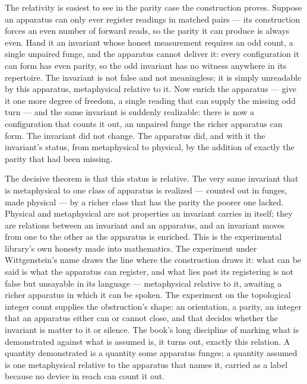 The relativity is easiest to see in the parity case the construction proves. Suppose an apparatus can
only ever register readings in matched pairs --- its construction forces an even number of forward
reads, so the parity it can produce is always even. Hand it an invariant whose honest measurement
requires an odd count, a single unpaired funge, and the apparatus cannot deliver it: every configuration
it can form has even parity, so the odd invariant has no witness anywhere in its repertoire. The
invariant is not false and not meaningless; it is simply unreadable by this apparatus, metaphysical
relative to it. Now enrich the apparatus --- give it one more degree of freedom, a single reading that
can supply the missing odd turn --- and the same invariant is suddenly realizable: there is now a
configuration that counts it out, an unpaired funge the richer apparatus can form. The invariant did not
change. The apparatus did, and with it the invariant's status, from metaphysical to physical, by the
addition of exactly the parity that had been missing.

The decisive theorem is that this status is relative. The very same invariant that is metaphysical to
one class of apparatus is realized --- counted out in funges, made physical --- by a richer class that
has the parity the poorer one lacked. Physical and metaphysical are not properties an invariant carries
in itself; they are relations between an invariant and an apparatus, and an invariant moves from one to
the other as the apparatus is enriched. This is the experimental library's own honesty made into
mathematics. The experiment under Wittgenstein's name draws the line where the construction draws it:
what can be said is what the apparatus can register, and what lies past its registering is not false but
unsayable in its language --- metaphysical relative to it, awaiting a richer apparatus in which it can
be spoken. The experiment on the topological integer count supplies the obstruction's shape: an
orientation, a parity, an integer that an apparatus either can or cannot close, and that decides whether
the invariant is matter to it or silence. The book's long discipline of marking what is demonstrated
against what is assumed is, it turns out, exactly this relation. A quantity demonstrated is a quantity
some apparatus funges; a quantity assumed is one metaphysical relative to the apparatus that names it,
carried as a label because no device in reach can count it out.

